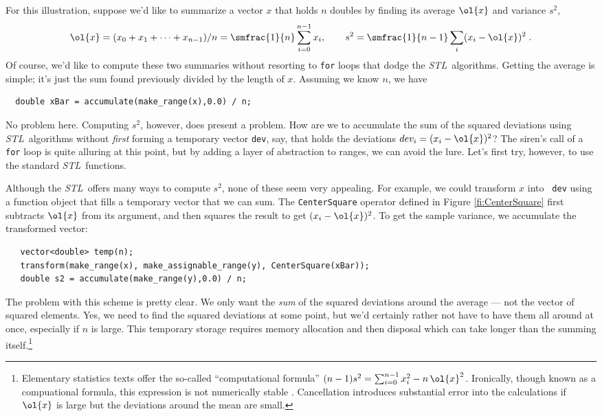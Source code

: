 \documentclass[12pt]{article}
\newcommand{\stl}{{\it STL}}
\begin{document}
  For this illustration, suppose we'd like to summarize a vector $x$
that holds $n$ doubles by finding its average $\ol{x}$ and variance
$s^2$, 
\begin{displaymath}
    \ol{x} = (x_0+x_1+\cdots+x_{n-1})/n = \smfrac{1}{n} \sum_{i=0}^{n-1} x_i, \qquad
     s^2 = \smfrac{1}{n-1} \sum_i (x_i - \ol{x})^2 \;.
\end{displaymath}
Of course, we'd like to compute these two summaries without resorting
to {\tt for} loops that dodge the \stl\ algorithms.  Getting the
average is simple; it's just the sum found previously divided by the
length of $x$.  Assuming we know $n$, we have
\begin{verbatim}
  double xBar = accumulate(make_range(x),0.0) / n;
\end{verbatim}
No problem here. Computing $s^2$, however, does present a problem.
How are we to accumulate the sum of the squared deviations using \stl\ 
algorithms without {\em first} forming a temporary vector {\tt dev},
say, that holds the deviations $dev_i = (x_i - \ol{x})^2$?  The
siren's call of a {\tt for} loop is quite alluring at this point, but
by adding a layer of abstraction to ranges, we can avoid the lure.
Let's first try, however, to use the standard \stl\ functions.


  Although the \stl\ offers many ways to compute $s^2$, none of these
seem very appealing.  For example, we could transform $x$ into {\tt
dev} using a function object that fills a temporary vector that we can
sum.  The {\tt CenterSquare} operator defined in Figure
\ref{fi:CenterSquare} first subtracts $\ol{x}$ from its argument, and
then squares the result to get $(x_i-\ol{x})^2$.  To get the sample
variance, we accumulate the transformed vector:
\begin{verbatim}
   vector<double> temp(n);
   transform(make_range(x), make_assignable_range(y), CenterSquare(xBar));
   double s2 = accumulate(make_range(y),0.0) / n;
\end{verbatim}
The problem with this scheme is pretty clear.  We only want the {\em
sum} of the squared deviations around the average --- not the vector
of squared elements.  Yes, we need to find the squared deviations at
some point, but we'd certainly rather not have to have them all around
at once, especially if $n$ is large.  This temporary storage requires
memory allocation and then disposal which can take longer than the
summing itself.\footnote{Elementary statistics texts offer the
so-called ``computational formula'' $(n-1)s^2 = \sum_{i=0}^{n-1} x_i^2
- n \, \ol{x}^2$.  Ironically, though known as a compuational formula,
this expression is not numerically stable \citep{golubxx}.
Cancellation introduces substantial error into the calculations if
$\ol{x}$ is large but the deviations around the mean are small.}
\end{document}

